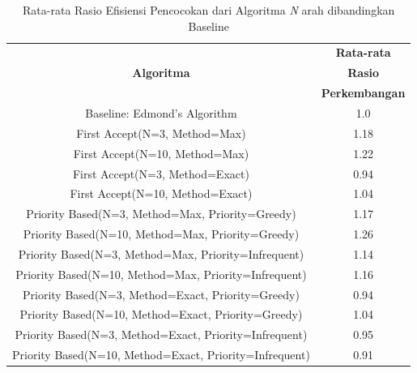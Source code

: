 \documentclass[conference]{IEEEtran}
\begin{document}
\begin{table}[htbp]
    \caption{Rata-rata Rasio Efisiensi Pencocokan dari Algoritma \textit{N} arah dibandingkan Baseline}
    \begin{center}
    \def\arraystretch{1.5}
    \begin{tabular}{|c|c|}
    \hline
    \cellcolor{tableheader}&\cellcolor{tableheader}\textbf{Rata-rata} \\
    \cellcolor{tableheader}\textbf{Algoritma}&\cellcolor{tableheader}\textbf{Rasio}\\
    \cellcolor{tableheader}&\cellcolor{tableheader}\textbf{Perkembangan}\\
    \hline
    Baseline: Edmond's Algorithm&1.0 \\
    \hline
    First Accept(N=3, Method=Max)&\cellcolor{moreratio}1.18 \\
    \hline
    First Accept(N=10, Method=Max)&\cellcolor{moreratio}1.22 \\
    \hline
    First Accept(N=3, Method=Exact)&\cellcolor{lessratio}0.94 \\
    \hline
    First Accept(N=10, Method=Exact)&\cellcolor{moreratio}1.04 \\
    \hline
    Priority Based(N=3, Method=Max, Priority=Greedy)&\cellcolor{moreratio}1.17 \\
    \hline
    Priority Based(N=10, Method=Max, Priority=Greedy)&\cellcolor{moreratio}1.26 \\
    \hline
    Priority Based(N=3, Method=Max, Priority=Infrequent)&\cellcolor{moreratio}1.14 \\
    \hline
    Priority Based(N=10, Method=Max, Priority=Infrequent)&\cellcolor{moreratio}1.16 \\
    \hline
    Priority Based(N=3, Method=Exact, Priority=Greedy)&\cellcolor{lessratio}0.94 \\
    \hline
    Priority Based(N=10, Method=Exact, Priority=Greedy)&\cellcolor{moreratio}1.04 \\
    \hline
    Priority Based(N=3, Method=Exact, Priority=Infrequent)&\cellcolor{lessratio}0.95 \\
    \hline
    Priority Based(N=10, Method=Exact, Priority=Infrequent)&\cellcolor{lessratio}0.91 \\
    \hline
    \end{tabular}
    \label{avgmatcheffratio}
    \end{center}
\end{table}
\end{document}
